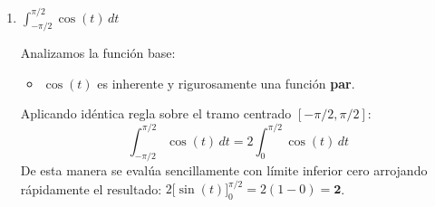 \documentclass[10pt,a4paper]{article}
\begin{document}
\begin{enumerate}[label=\textbf{\alph*)}]
		Analizamos $f(t) = t\sin(t)$:
		\begin{itemize}
		    \item $t$ es \textbf{impar}.
		    \item $\sin(t)$ es \textbf{impar}.
		    \item El producto de dos funciones impares es una función \textbf{par}.
		\end{itemize}
		Para una función par sobre un intervalo simétrico $[-L, L]$, la regla establece que la integral equivale a duplicar la integral sobre la mitad estricta del intervalo $[0, L]$:
		\[
		\int_{-\pi}^{\pi} t\sin(t)\,dt = 2\int_{0}^{\pi} t\sin(t)\,dt
		\]
		Para resolver analíticamente la integral sobre este semi-dominio, aplicamos integración por partes $\int u\,dv = uv - \int v\,du$. Elegimos:
		\begin{align*}
		    u &= t \quad \Rightarrow \quad du = dt \\
		    dv &= \sin(t)\,dt \quad \Rightarrow \quad v = -\cos(t)
		\end{align*}
		Armando el cálculo de la integral definida:
		\begin{align*}
		    \int_{0}^{\pi} t\sin(t)\,dt &= \Big[-t\cos(t)\Big]_{0}^{\pi} - \int_{0}^{\pi} (-\cos(t))\,dt \\
		    &= \Big[-t\cos(t) + \sin(t)\Big]_{0}^{\pi} \\
		    &= \Big( -\pi\cos(\pi) + \sin(\pi) \Big) - \Big( -0\cdot\cos(0) + \sin(0) \Big) \\
		    &= \Big( -\pi(-1) + 0 \Big) - \Big( 0 + 0 \Big) = \pi
		\end{align*}
		Finalmente, retomando el factor del duplo producto de la simetría par:
		\[
		\int_{-\pi}^{\pi} t\sin(t)\,dt = 2\int_{0}^{\pi} t\sin(t)\,dt = 2(\pi) = \mathbf{2\pi}
		\]

		\item $\displaystyle\int_{-\pi/2}^{\pi/2} \cos(t)\,dt$
		
		Analizamos la función base:
		\begin{itemize}
		    \item $\cos(t)$ es inherente y rigurosamente una función \textbf{par}.
		\end{itemize}
		Aplicando idéntica regla sobre el tramo centrado $[-\pi/2, \pi/2]$:
		\[
		\int_{-\pi/2}^{\pi/2} \cos(t)\,dt = 2\int_{0}^{\pi/2} \cos(t)\,dt
		\]
		De esta manera se evalúa sencillamente con límite inferior cero arrojando rápidamente el resultado: $2 \big[\sin(t)\big]_0^{\pi/2} = 2(1-0) = \mathbf{2}$.


\end{enumerate}
\end{document}

